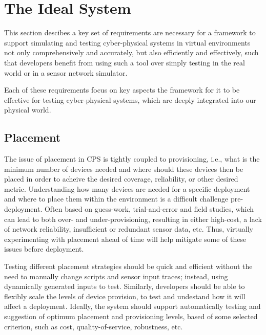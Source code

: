 \section{The Ideal System}
\label{sec:Requirements}
This section descibes a key set of requirements are necessary for a framework to support simulating and testing cyber-physical systems in virtual environments not only comprehensively and accurately, but also efficiently and effectively, such that developers benefit from using such a tool over simply testing in the real world or in a sensor network simulator.

Each of these requirements focus on key aspects the framework for it to be effective for testing cyber-physical systems, which are deeply integrated into our physical world.

\subsection{Placement}
\label{sub:requirements_3D design and placement}
The issue of placement in CPS is tightly coupled to provisioning, i.e., what is the minimum number of devices needed and where should these devices then be placed in order to acheive the desired coverage, reliability, or other desired metric. 
Understanding how many devices are needed for a specific deployment and where to place them within the environment is a difficult challenge pre-deployment. Often based on guess-work, trial-and-error and field studies, which can lead to both over- and under-provisioning, resulting in either high-cost, a lack of network reliability, insufficient or redundant sensor data, etc. 
Thus, virtually experimenting with placement ahead of time will help mitigate some of these issues before deployment. 

Testing different placement strategies should be quick and efficient without the need to manually change scripts and sensor input traces; instead, using dynamically generated inputs to test. Similarly, developers should be able to flexibly scale the levels of device provision, to test and undestand how it will affect a deployment. Ideally, the system should support automatically testing and suggestion of optimum placement and provisioning levels, based of some selected criterion, such as cost, quality-of-service, robustness, etc.



